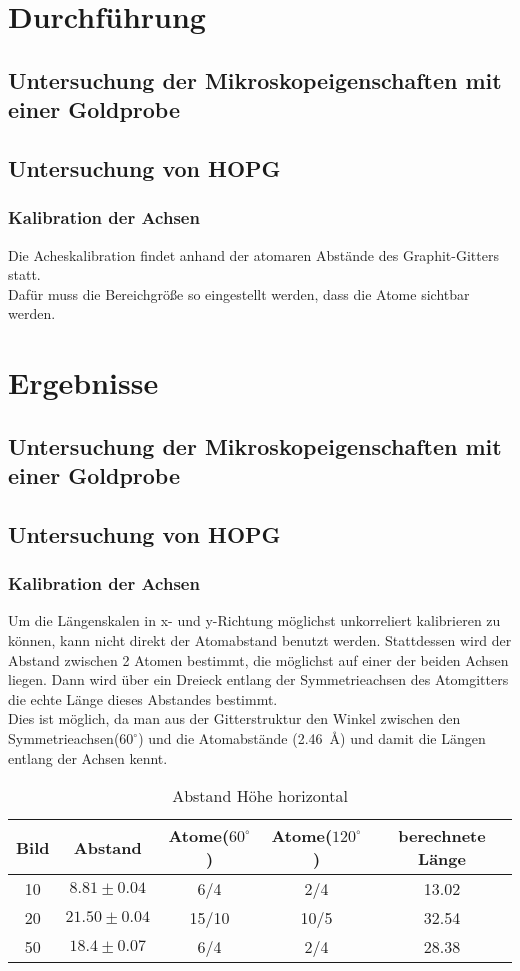 \documentclass[12pt,a4paper]{article}
\begin{document}
\section{Durchführung}
\subsection{Untersuchung der Mikroskopeigenschaften mit einer Goldprobe}
\subsection{Untersuchung von HOPG}

\subsubsection{Kalibration der Achsen}
Die Acheskalibration findet anhand der atomaren Abstände des Graphit-Gitters statt.\\
Dafür muss die Bereichgröße so eingestellt werden, dass die Atome sichtbar werden.

\section{Ergebnisse}
\subsection{Untersuchung der Mikroskopeigenschaften mit einer Goldprobe}

\subsection{Untersuchung von HOPG}
\subsubsection{Kalibration der Achsen}
Um die Längenskalen in x- und y-Richtung möglichst unkorreliert kalibrieren zu können, kann nicht direkt der Atomabstand benutzt werden. Stattdessen wird der Abstand zwischen 2 Atomen bestimmt, die möglichst auf einer der beiden Achsen liegen. Dann wird über ein Dreieck entlang der Symmetrieachsen des Atomgitters die echte Länge dieses Abstandes bestimmt.\\
Dies ist möglich, da man aus der Gitterstruktur den Winkel zwischen den Symmetrieachsen($60^{\circ}$) und die Atomabstände (\SI{2.46}{\angstrom}) und damit die Längen entlang der Achsen kennt.

\begin{table}
\begin{tabular}{|c|c||c|c||c|}
\hline 
Bild & Abstand & Atome($60^{\circ}$) & Atome($120^{\circ}$) & berechnete Länge \\ 
\hline 
10 & $8.81\pm 0.04$ & 6/4 & 2/4 & 13.02\\ 
\hline 
20 & $21.50\pm 0.04$ & 15/10 & 10/5 & 32.54\\ 
\hline 
50 & $18.4\pm 0.07$ & 6/4  & 2/4 & 28.38\\ 
\hline 
\end{tabular} 
\caption{Abstand Höhe horizontal}
\label{test}
\end{table}
\end{document}
